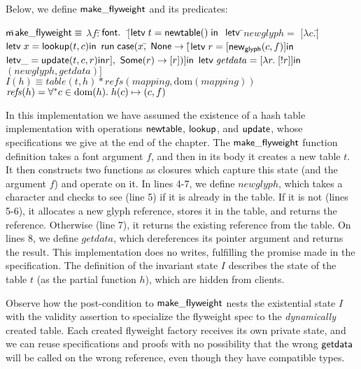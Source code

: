 Below, we define $\mathsf{make\_flyweight}$ and its predicates:

\begin{specification}
\nextline $\mathsf{m}$\=$\mathsf{ake\_flyweight} \equiv$ 
\nextline            \> $\lambda f:$\=$\mathsf{font}.\;$
\nextline \> $[$\=$\mathsf{letv}\;t = \mathsf{newtable}()\;\mathsf{in}\;$ 
\nextline \> \> $\mathsf{letv\;}$\=$\mathit{newglyph} =$ 
\nextline \> \> \> \!\!$[\lambda c.[$\=$\mathsf{letv}\; x = \mathsf{lookup}(t, c)\mathsf{ in}$
\nextline \> \>\>\> $\mathsf{run}\;\mathsf{case}(x,$\=
$\mathsf{None} \to [$\=$\mathsf{letv}\; r = [\mathsf{new}_{\mathsf{glyph}}(c,f)] \mathsf{ in}$
\nextline \> \>\>\>\>\> $\mathsf{letv } \_ = \mathsf{update}(t, c, r) \mathsf{ in }r],$ 
\nextline \> \>\>\>\> $\mathsf{Some}(r) \to [r])] \mathsf{ in}$ 
\nextline \> \> $\mathsf{letv\;}\mathit{getdata} = [\lambda r.\; [!r]] \mathsf{ in}$ 
\nextline \> \> $(\mathit{newglyph}, \mathit{getdata})]$
\\

\nextline $I(h) \equiv table(t,h) * \mathit{refs}(mapping, \mbox{dom}(mapping))$ \\
\nextline $\mathit{refs}(h) = \forall^{*} c \in \mbox{dom}({h}).\; h(c) \mapsto (c, f)$ 
\end{specification}


In this implementation we have assumed the existence of a hash table
implementation with operations $\mathsf{newtable}$, $\mathsf{lookup}$,
and $\mathsf{update}$, whose specifications we give at the end of the
chapter. The $\mathsf{make\_flyweight}$ function definition takes a
font argument $f$, and then in its body it creates a new table $t$. It
then constructs two functions as closures which capture this state
(and the argument $f$) and operate on it. In lines 4-7, we define
$newglyph$, which takes a character and checks to see (line 5) if it
is already in the table. If it is not (lines 5-6), it allocates a new
glyph reference, stores it in the table, and returns the
reference. Otherwise (line 7), it returns the existing reference from
the table.  On lines 8, we define $getdata$, which dereferences its
pointer argument and returns the result. This implementation does no
writes, fulfilling the promise made in the specification. The
definition of the invariant state $I$ describes the state of the table
$t$ (as the partial function $h$), which are hidden from clients.

Observe how the post-condition to $\mathsf{make\_flyweight}$ nests the
existential state $I$ with the validity assertion to specialize the
flyweight spec to the \emph{dynamically} created table. Each created
flyweight factory receives its own private state, and we can reuse
specifications and proofs with no possibility that the wrong
$\mathsf{getdata}$ will be called on the wrong reference, even though
they have compatible types.

